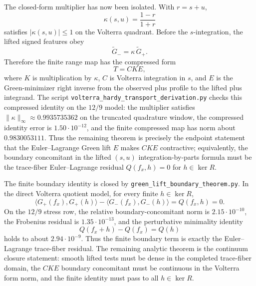 \documentclass[11pt]{article}
\begin{document}
The closed-form multiplier has now been isolated.  With \(r=s+u\),
\[
  \kappa(s,u)=\frac{1-r}{1+r}
\]
satisfies \(|\kappa(s,u)|\le 1\) on the Volterra quadrant.  Before the
\(s\)-integration, the lifted signed features obey
\[
  \widetilde G_-=\kappa\,\widetilde G_+ .
\]
Therefore the finite range map has the compressed form
\[
  T=C K E,
\]
where \(K\) is multiplication by \(\kappa\), \(C\) is Volterra integration in
\(s\), and \(E\) is the Green-minimizer right inverse from the observed plus
profile to the lifted plus integrand.  The script
\texttt{volterra\_hardy\_transport\_derivation.py} checks this compressed
identity on the \(12/9\) model: the multiplier satisfies
\(\|\kappa\|_\infty\approx0.9935735362\) on the truncated quadrature window,
the compressed identity error is \(1.50\cdot10^{-12}\), and the finite
compressed map has norm about \(0.9830053111\).  Thus the remaining theorem is
precisely the endpoint statement that the Euler--Lagrange Green lift \(E\)
makes \(CKE\) contractive; equivalently, the boundary concomitant in the
lifted \((s,u)\) integration-by-parts formula must be the trace-fiber
Euler--Lagrange residual \(Q(f_x,h)=0\) for \(h\in\ker R\).

The finite boundary identity is closed by
\texttt{green\_lift\_boundary\_theorem.py}.  In the direct Volterra quotient
model, for every finite \(h\in\ker R\),
\[
  \langle G_+(f_x),G_+(h)\rangle
  -
  \langle G_-(f_x),G_-(h)\rangle
  =
  Q(f_x,h)=0 .
\]
On the \(12/9\) stress row, the relative boundary-concomitant norm is
\(2.15\cdot10^{-10}\), the Frobenius residual is \(1.35\cdot10^{-13}\), and
the perturbative minimality identity
\[
  Q(f_x+h)-Q(f_x)=Q(h)
\]
holds to about \(2.94\cdot10^{-9}\).  Thus the finite boundary term is exactly
the Euler--Lagrange trace-fiber residual.  The remaining analytic theorem is
the continuum closure statement: smooth lifted tests must be dense in the
completed trace-fiber domain, the \(CKE\) boundary concomitant must be
continuous in the Volterra form norm, and the finite identity must pass to
all \(h\in\ker R\).
\end{document}
